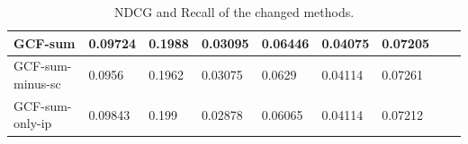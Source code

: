 \begin{table}[]
\begin{tabular}{|l|l|l|l|l|l|l|l|l|}
        GCF-sum              & 0.09724                       & 0.1988                                 & 0.03095                          & 0.06446             & 0.04075             & 0.07205             \\ \hline
        GCF-sum-minus-sc     & 0.0956                        & 0.1962                                 & 0.03075                          & 0.0629              & 0.04114             & 0.07261             \\ \hline
        GCF-sum-only-ip      & 0.09843                       & 0.199                                  & 0.02878                          & 0.06065             & 0.04114             & 0.07212             \\ \hline
    \end{tabular}
    \caption{NDCG and Recall of the changed methods.}
    \label{tab:ablation-results}
\end{table}

